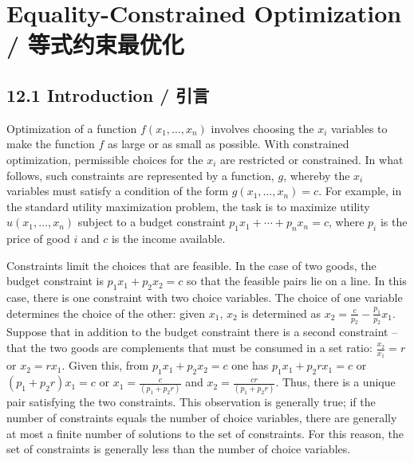 
\section{Equality-Constrained Optimization / 等式约束最优化}

\subsection{12.1 Introduction / 引言}

\begin{original}
Optimization of a function $f(x_1,\ldots,x_n)$ involves choosing the $x_i$ variables to make the function $f$ as large or as small as possible. With constrained optimization, permissible choices for the $x_i$ are restricted or constrained. In what follows, such constraints are represented by a function, $g$, whereby the $x_i$ variables must satisfy a condition of the form $g(x_1,\ldots,x_n) = c$. For example, in the standard utility maximization problem, the task is to maximize utility $u(x_1,\ldots,x_n)$ subject to a budget constraint $p_1x_1 + \cdots + p_nx_n = c$, where $p_i$ is the price of good $i$ and $c$ is the income available.

Constraints limit the choices that are feasible. In the case of two goods, the budget constraint is $p_1x_1 + p_2x_2 = c$ so that the feasible pairs lie on a line. In this case, there is one constraint with two choice variables. The choice of one variable determines the choice of the other: given $x_1$, $x_2$ is determined as $x_2 = \frac{c}{p_2} - \frac{p_1}{p_2}x_1$. Suppose that in addition to the budget constraint there is a second constraint -- that the two goods are complements that must be consumed in a set ratio: $\frac{x_2}{x_1} = r$ or $x_2 = rx_1$. Given this, from $p_1x_1 + p_2x_2 = c$ one has $p_1x_1 + p_2rx_1 = c$ or $(p_1 + p_2r)x_1 = c$ or $x_1 = \frac{c}{(p_1 + p_2r)}$ and $x_2 = \frac{cr}{(p_1 + p_2r)}$. Thus, there is a unique pair satisfying the two constraints. This observation is generally true; if the number of constraints equals the number of choice variables, there are generally at most a finite number of solutions to the set of constraints. For this reason, the set of constraints is generally less than the number of choice variables.


\end{original}
